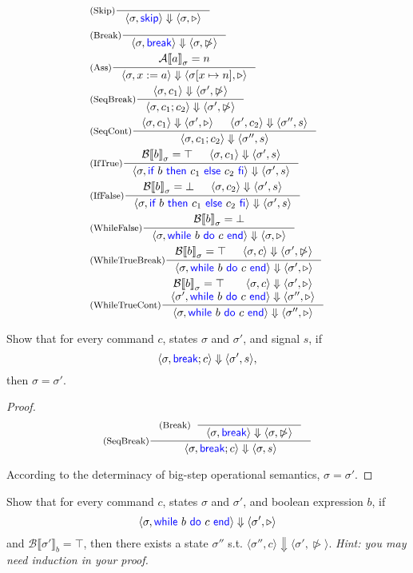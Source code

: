 \documentclass[11pt,a4paper]{article}
\let\sCont\triangleright
\let\sBreak\ntriangleright
\newcommand{\pair}[1]{\langle #1 \rangle}
\newcommand{\evalA}[2]{{\mathcal{A}\llbracket #1 \rrbracket}_{#2}}
\newcommand{\evalB}[2]{{\mathcal{B}\llbracket #1 \rrbracket}_{#2}}
\newcommand{\evalCsig}[4]{\pair{#1, #2} \Downarrow \pair{#3, #4}}
\newcommand{\kword}[1]{{\color{blue} \textsf{#1}}}
\newcommand{\Skip}{\kword{skip}}
\newcommand{\If}{\kword{if}}
\newcommand{\Then}{\kword{then}}
\newcommand{\Else}{\kword{else}}
\newcommand{\Fi}{\kword{fi}}
\newcommand{\While}{\kword{while}}
\newcommand{\Do}{\kword{do}}
\newcommand{\End}{\kword{end}}
\newcommand{\Break}{\kword{break}}
\begin{document}
\begin{solution}
  \begin{align*}
    &\inference[(Skip)]{}{\evalCsig{\sigma}{\Skip}{\sigma}{\sCont}} \\
    &\inference[(Break)]{}{\evalCsig{\sigma}{\Break}{\sigma}{\sBreak}} \\
  	&\inference[(Ass)]{\evalA{a}{\sigma}=n}{\evalCsig{\sigma}{x:=a}{\sigma[x\mapsto n]}{\sCont}} \\
  	&\inference[(SeqBreak)]{\evalCsig{\sigma}{c_1}{\sigma'}{\sBreak}}{\evalCsig{\sigma}{c_1;c_2}{\sigma'}{\sBreak}} \\
  	&\inference[(SeqCont)]{\evalCsig{\sigma}{c_1}{\sigma'}{\sCont} & \evalCsig{\sigma'}{c_2}{\sigma''}{s}}{\evalCsig{\sigma}{c_1;c_2}{\sigma''}{s}} \\
    &\inference[(IfTrue)]{\evalB{b}{\sigma}=\top & \evalCsig{\sigma}{c_1}{\sigma'}{s}}{\evalCsig{\sigma}{\If~b~\Then~c_1~\Else~c_2~\Fi}{\sigma'}{s}} \\
  	&\inference[(IfFalse)]{\evalB{b}{\sigma}=\bot & \evalCsig{\sigma}{c_2}{\sigma'}{s}}{\evalCsig{\sigma}{\If~b~\Then~c_1~\Else~c_2~\Fi}{\sigma'}{s}} \\
  	&\inference[(WhileFalse)]{\evalB{b}{\sigma}=\bot}{\evalCsig{\sigma}{\While~b~\Do~c~\End}{\sigma}{\sCont}} \\
    &\inference[(WhileTrueBreak)]{\evalB{b}{\sigma}=\top & \evalCsig{\sigma}{c}{\sigma'}{\sBreak}}{\evalCsig{\sigma}{\While~b~\Do~c~\End}{\sigma'}{\sCont}} \\
  	&\inference[(WhileTrueCont)]{\evalB{b}{\sigma}=\top & \evalCsig{\sigma}{c}{\sigma'}{\sCont} \\ \evalCsig{\sigma'}{\While~b~\Do~c~\End}{\sigma''}{\sCont}}{\evalCsig{\sigma}{\While~b~\Do~c~\End}{\sigma''}{\sCont}}
  \end{align*}
\end{solution}

\subproblem Show that for every command $c$, states $\sigma$ and $\sigma'$, and signal $s$,
if $$\evalCsig{\sigma}{\Break;c}{\sigma'}{s},$$ then $\sigma=\sigma'$.

\begin{proof}
  $$\inference[(SeqBreak)]{\inference[(Break)]{}{\evalCsig{\sigma}{\Break}{\sigma}{\sBreak}}}{\evalCsig{\sigma}{\Break;c}{\sigma}{s}}$$
  
  According to the determinacy of big-step operational semantics, $\sigma = \sigma'$.
\end{proof}

\subproblem Show that for every command $c$, states $\sigma$ and $\sigma'$, and boolean expression $b$,
if $$\evalCsig{\sigma}{\While~b~\Do~c~\End}{\sigma'}{\sCont}$$ and $\evalB{\sigma'}{b}=\top$,
then there exists a state $\sigma''$ s.t. $\evalCsig{\sigma''}{c}{\sigma'}{\sBreak}$.
\textit{Hint: you may need induction in your proof.}
\end{document}
